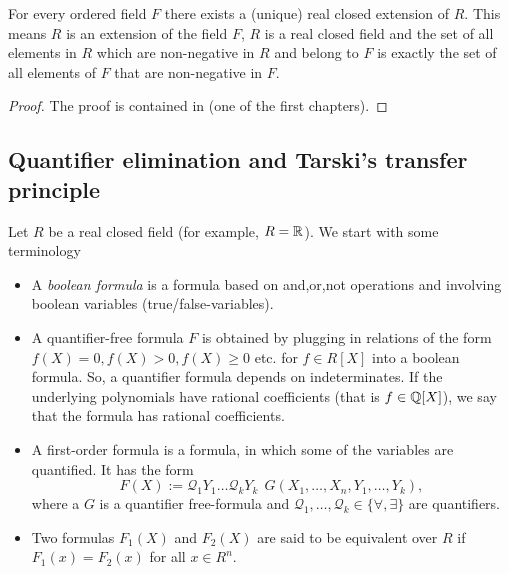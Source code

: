 \begin{theorem}
	\label{thm:extending:to:real:closed}
	For every ordered field $F$ there exists a (unique) real closed extension of $R$. This means $R$ is an extension of the field $F$, $R$ is a real closed field and the set of all elements in $R$ which are non-negative in $R$ and belong to $F$ is exactly the set of all elements of $F$ that are non-negative in $F$. 
\end{theorem}
\begin{proof}
	The proof is contained in \cite{Bochnak:Coste:Roy:1998} (one of the first chapters). 
\end{proof}

\subsection{Quantifier elimination and Tarski's transfer principle}

Let $R$ be a real closed field (for example, $R=\mathbb{R}$).  We start with some terminology
\begin{itemize}
	\item A \emph{boolean formula} is a formula based on and,or,not operations and involving boolean variables (true/false-variables).
	\item A quantifier-free formula $F$ is obtained by plugging in relations of the form $f(X)=0, f(X)>0, f(X) \ge 0$ etc. for $f \in R[X]$ into a boolean formula. So, a quantifier formula depends on indeterminates. If the underlying polynomials have rational coefficients (that is $f \in \mathbb{Q}[X]$), we say that the formula has rational coefficients.
	\item A first-order formula is a formula, in which some of the variables are quantified. It has the form 
	\[
		F(X):= \mathcal{Q}_1 Y_1 \ldots \mathcal{Q}_k Y_k \ \ G(X_1,\ldots,X_n,Y_1,\ldots,Y_k),
	\] where a $G$ is a quantifier free-formula and $\mathcal{Q}_1,\ldots,\mathcal{Q}_k \in \{ \forall, \exists\}$ are quantifiers.
	\item Two formulas $F_1(X)$ and $F_2(X)$ are said to be equivalent over $R$ if $F_1(x)=F_2(x)$ for all $x \in R^n$. 
\end{itemize}


